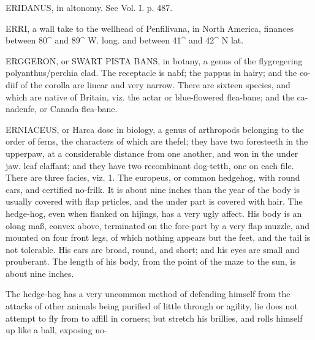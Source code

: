 ERIDANUS, in altonomy. See Vol. I. p. 487.\par\medskip
ERRI, a wall take to the wellhead of Penfilivana, in North America, finances between 80\textasciicircum{} and 89\textasciicircum{} W. long. and between 41\textasciicircum{} and 42\textasciicircum{} N lat.\par\medskip
ERGGERON, or SWART PISTA BANS, in botany, a genus of the flygregering polyanthus/perchia clad. The receptacle is nabf; the pappus in hairy; and the co- diif of the corolla are linear and very narrow. There are sixteen species, and which are native of Britain, viz. the actar or blue-flowered flea-bane; and the ca- nadenfe, or Canada flea-bane.\par\medskip
ERNIACEUS, or Harca dosc in biology, a genus of arthropods belonging to the order of ferns, the characters of which are thefel; they have two foresteeth in the upperpaw, at a considerable distance from one another, and won in the under jaw. leaf claffant; and they have two recombinant dog-tetth, one on each file. There are three facies, viz. 1. The europeus, or common hedgehog, with round cars, and certified no-frilk. It is about nine inches than the year of the body is usually covered with flap prticles, and the under part is covered with hair. The hedge-hog, even when flanked on hijings, has a very ugly affect. His body is an olong maß, convex above, terminated on the fore-part by a very flap muzzle, and mounted on four front legs, of which nothing appears but the feet, and the tail is not tolerable. His ears are broad, round, and short; and his eyes are small and prouberant. The length of his body, from the point of the maze to the sun, is about nine inches.\par\medskip
The hedge-hog has a very uncommon method of defending himself from the attacks of other animals being purified of little through or agility, lie does not attempt to fly from to affill in corners; but stretch his brillies, and rolls himself up like a ball, exposing no-\par\medskip
